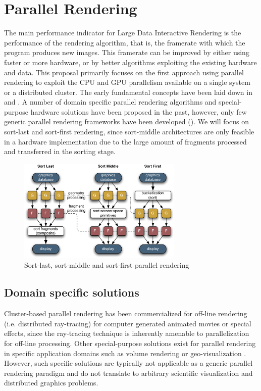 \section{Parallel Rendering}

The main performance indicator for Large Data Interactive Rendering is the
performance of the rendering algorithm, that is, the framerate with which the
program produces new images. This framerate can be improved by either using
faster or more hardware, or by better algorithms exploiting the existing
hardware and data. This proposal primarily focuses on the first approach using
parallel rendering to exploit the CPU and GPU parallelism available on a single
system or a distributed cluster.  The early fundamental concepts have been laid
down in \cite{MCEF:94} and \cite{Crockett:97}. A number of domain specific
parallel rendering algorithms and special-purpose hardware solutions have been
proposed in the past, however, only few generic parallel rendering frameworks
have been developed (). We will focus on sort-last and sort-first
rendering, since sort-middle architectures are only feasible in a hardware
implementation due to the large amount of fragments processed and transferred in
the sorting stage.

\begin{figure}[ht]\center
 \includegraphics[width=0.7\textwidth]{images/all_sorts}%
 \caption{Sort-last, sort-middle and sort-first parallel rendering\label{fSorts}}
\end{figure}


\subsection{Domain specific solutions}

Cluster-based parallel rendering has been commercialized for off-line rendering
(i.e. distributed ray-tracing) for computer generated animated movies or special
effects, since the ray-tracing technique is inherently amenable to
parallelization for off-line processing. Other special-purpose solutions exist
for parallel rendering in specific application domains such as volume rendering
\cite{LWMT:97,Wittenbrink:98,HSCSM:00,SL:02,GS:02,NSJLYZ:05} or
geo-visualization \cite{VR:91,AG:95,LDC:96,JLMV:06}. However, such specific
solutions are typically not applicable as a generic parallel rendering paradigm
and do not translate to arbitrary scientific visualization and distributed
graphics problems.

